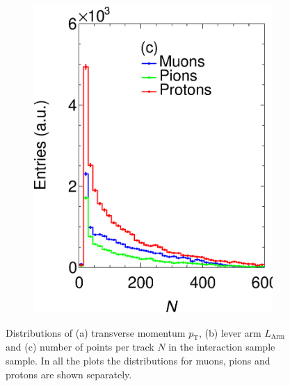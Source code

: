 \begin{figure}[t]
\begin{subfigure}[b]{0.32\textwidth}
         \includegraphics[width=\textwidth]{figures/ch5-KF_NDGAr/FullSample/Int/Props/NTall.eps}
         \caption{}
         \label{fig:NTPC_Int}
     \end{subfigure}
        \caption[Distributions of key track quantities in the interaction sample]{Distributions of (a) transverse momentum $p_{\textrm{T}}$,  (b) lever arm $L_{\textrm{Arm}}$ and (c) number of points per track $N$ in the interaction sample sample. In all the plots the distributions for muons, pions and protons are shown separately. } \label{fig:TPCProperties_Int}
\end{figure}


